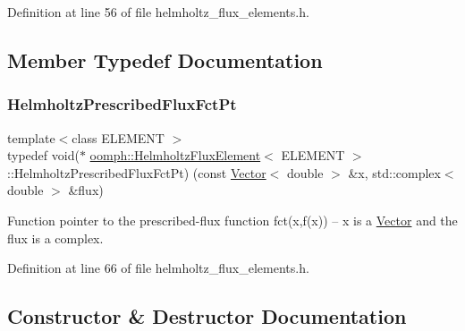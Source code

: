 Definition at line 56 of file helmholtz\+\_\+flux\+\_\+elements.\+h.



\subsection{Member Typedef Documentation}
\mbox{\label{classoomph_1_1HelmholtzFluxElement_ad53ce405c551a39ac9baeaaab7f254df}} 
\subsubsection{\texorpdfstring{Helmholtz\+Prescribed\+Flux\+Fct\+Pt}{HelmholtzPrescribedFluxFctPt}}
{\footnotesize\ttfamily template$<$class E\+L\+E\+M\+E\+NT $>$ \\
typedef void($\ast$ \hyperlink{classoomph_1_1HelmholtzFluxElement}{oomph\+::\+Helmholtz\+Flux\+Element}$<$ E\+L\+E\+M\+E\+NT $>$\+::Helmholtz\+Prescribed\+Flux\+Fct\+Pt) (const \hyperlink{classoomph_1_1Vector}{Vector}$<$ double $>$ \&x, std\+::complex$<$ double $>$ \&flux)}



Function pointer to the prescribed-\/flux function fct(x,f(x)) -- x is a \hyperlink{classoomph_1_1Vector}{Vector} and the flux is a complex. 



Definition at line 66 of file helmholtz\+\_\+flux\+\_\+elements.\+h.



\subsection{Constructor \& Destructor Documentation}
\mbox{\label{classoomph_1_1HelmholtzFluxElement_a8c9a62afbb6ed06a0441d4fbf607624c}} 
